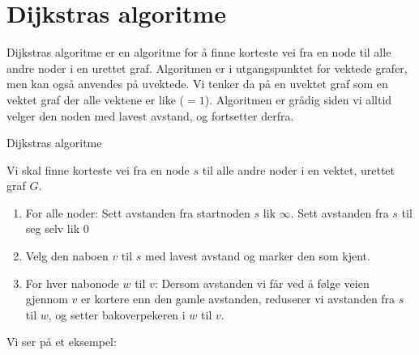\section{Dijkstras algoritme}
\label{dijkstra}

Dijkstras algoritme er en algoritme for å finne korteste vei fra en node til alle andre noder i en urettet graf. Algoritmen er i utgangspunktet for vektede grafer, men kan også anvendes på uvektede. Vi tenker da på en uvektet graf som en vektet graf der alle vektene er like ($ =1 $). Algoritmen er grådig siden vi alltid velger den noden med lavest avstand, og fortsetter derfra. 

\begin{theorem}Dijkstras algoritme

Vi skal finne korteste vei fra en node $ s $ til alle andre noder i en vektet, urettet graf $ G $. 
\begin{enumerate}
\item For alle noder: Sett avstanden fra startnoden $ s $ lik $ \infty $. Sett avstanden fra $ s $ til seg selv lik 0
\item Velg den naboen $ v $ til $ s $ med lavest avstand og marker den som kjent.
\item For hver nabonode $ w $ til $ v $: Dersom avstanden vi får ved å følge veien gjennom $ v $ er kortere enn den gamle avstanden, reduserer vi avstanden fra $ s $ til $ w $, og setter bakoverpekeren i $ w $ til $ v $. 
\end{enumerate}
\end{theorem}


\noindent Vi ser på et eksempel:

